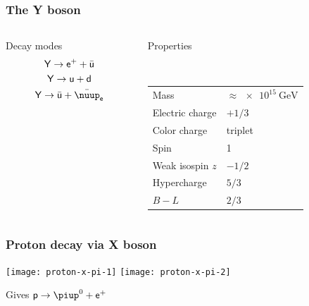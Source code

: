\documentclass[english, fleqn]{beamer}
\begin{document}
\begin{frame}
    \frametitle{The Y boson}

    \begin{columns}[t]
        \begin{column}{.5\textwidth}
            \begin{block}{Decay modes}
                \begin{gather*}
                    \mathsf Y \to \mathsf e^+ + \bar{\mathsf u} \\
                    \mathsf Y \to \mathsf u + \mathsf d \\
                    \mathsf Y \to \bar{\mathsf u} + \bar{\nuup}_\mathsf e
                \end{gather*}
            \end{block}
        \end{column}
        \begin{column}{.5\textwidth}
            \begin{block}{Properties}

                \

                \begin{tabular}{ll}
                    Mass & $\approx \SI{e15}{\giga\electronvolt}$ \\
                    Electric charge & $+1/3$ \\
                    Color charge & triplet \\
                    Spin & 1 \\
                    Weak isospin $z$ & $-1/2$ \\
                    Hypercharge & $5/3$ \\
                    $B - L$ & $2/3$
                \end{tabular}
            \end{block}
        \end{column}
    \end{columns}

    \parencite{wikipedia/x_y_bosons}
\end{frame}

\begin{frame}
    \frametitle{Proton decay via X boson}

    \begin{center}
        \texttt{[image: proton-x-pi-1]}
        \pause
        \hfill
        \texttt{[image: proton-x-pi-2]}
    \end{center}

    \begin{center}
        Gives $\mathsf p \to \piup^0 + \mathsf e^+$
    \end{center}
\end{frame}
\end{document}
